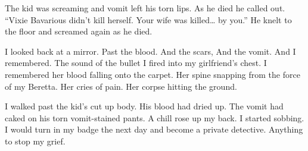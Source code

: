 The kid was screaming and vomit left his torn lips. As he died he
called out. ``Vixie Bavarious didn't kill herself. Your
wife was killed{\ldots} by you.'' He knelt to the floor and
screamed again as he died.

I looked back at a mirror. Past the blood. And the scars, And the
vomit. And I remembered. The sound of the bullet I fired into my
girlfriend's chest. I remembered her blood falling onto the
carpet. Her spine snapping from the force of my Beretta. Her cries
of pain. Her corpse hitting the ground.

I walked past the kid's cut up body. His blood had dried up.
The vomit had caked on his torn vomit-stained pants. A chill rose
up my back. I started sobbing. I would turn in my badge the next
day and become a private detective. Anything to stop my
grief.


 






